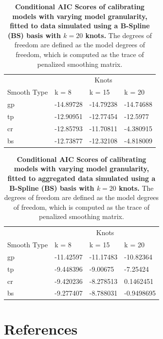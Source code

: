 \documentclass[
11pt, %
oneside, %
english, %
singlespacing, %
]{macthesis} %
\begin{document}
\begin{table}[!h]
\centering
\caption{\label{tab:aic-table-sim-bs}\textbf{Conditional AIC Scores of calibrating models with varying model granularity, fitted to data simulated using a B-Spline (BS) basis with \(k=20\) knots.} The degrees of freedom are defined as the model degrees of freedom, which is computed as the trace of penalized smoothing matrix.}
\centering
\begin{tabular}[t]{llll}
\toprule
\multicolumn{1}{c}{ } & \multicolumn{3}{c}{Knots} \\
\cmidrule(l{3pt}r{3pt}){2-4}
Smooth Type & k = 8 & k = 15 & k = 20\\
\midrule
gp & -14.89728 & -14.79238 & -14.74688\\
tp & -12.90951 & -12.77454 & -12.5977\\
cr & -12.85793 & -11.70811 & -4.380915\\
bs & -12.73877 & -12.32108 & -4.818009\\
\bottomrule
\end{tabular}
\end{table}

\begin{table}[!h]
\centering
\caption{\label{tab:aic-table-sim-agg-bs}\textbf{Conditional AIC Scores of calibrating models with varying model granularity, fitted to aggregated data simulated using a B-Spline (BS) basis with \(k=20\) knots.} The degrees of freedom are defined as the model degrees of freedom, which is computed as the trace of penalized smoothing matrix.}
\centering
\begin{tabular}[t]{llll}
\toprule
\multicolumn{1}{c}{ } & \multicolumn{3}{c}{Knots} \\
\cmidrule(l{3pt}r{3pt}){2-4}
Smooth Type & k = 8 & k = 15 & k = 20\\
\midrule
gp & -11.42597 & -11.17483 & -10.82364\\
tp & -9.448396 & -9.00675 & -7.25424\\
cr & -9.420236 & -8.278513 & 0.1462451\\
bs & -9.277407 & -8.788031 & -0.9498695\\
\bottomrule
\end{tabular}
\end{table}

\backmatter

\chapter*{References}\label{references}
\end{document}
